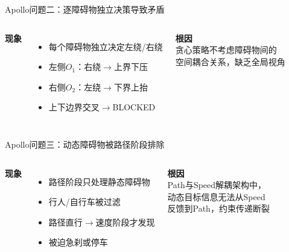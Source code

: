 \documentclass[aspectratio=169,10pt,fontset=none]{ctexbeamer}
\begin{document}
\begin{frame}{Apollo问题二：逐障碍物独立决策导致矛盾}
\begin{columns}[T,onlytextwidth]
  \centering
  \small
  \textbf{现象}
  \begin{itemize}\setlength\itemsep{3pt}
    \item 每个障碍物独立决定左绕/右绕
    \item 左侧$O_1$：右绕$\to$上界下压
    \item 右侧$O_2$：左绕$\to$下界上抬
    \item 上下边界交叉$\to$BLOCKED
  \end{itemize}
  \vspace{0.4em}
  \textbf{根因}\\
  贪心策略不考虑障碍物间的\\空间耦合关系，缺乏全局视角
\end{columns}
\end{frame}

\begin{frame}{Apollo问题三：动态障碍物被路径阶段排除}
\begin{columns}[T,onlytextwidth]
  \centering
  \small
  \textbf{现象}
  \begin{itemize}\setlength\itemsep{3pt}
    \item 路径阶段只处理静态障碍物
    \item 行人/自行车被过滤
    \item 路径直行$\to$速度阶段才发现
    \item 被迫急刹或停车
  \end{itemize}
  \vspace{0.4em}
  \textbf{根因}\\
  Path与Speed解耦架构中，\\动态目标信息无法从Speed\\反馈到Path，约束传递断裂
\end{columns}
\end{frame}
\end{document}
